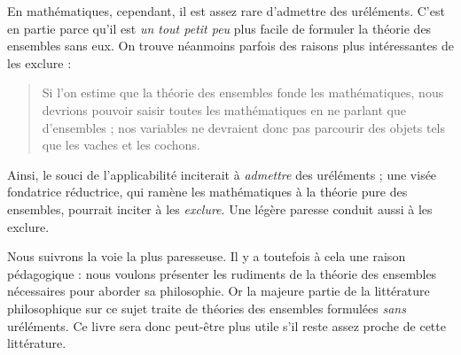 \documentclass[../../../include/open-logic-section]{subfiles}
\begin{document}
En mathématiques, cependant, il est assez rare d'admettre des
uréléments. C'est en partie parce qu'il est \emph{un tout petit peu}
plus facile de formuler la théorie des ensembles sans eux. On trouve
néanmoins parfois des raisons plus intéressantes de les exclure :
\begin{quote}
	Si l'on estime que la théorie des ensembles fonde les
	mathématiques, nous devrions pouvoir saisir toutes les
	mathématiques en ne parlant que d'ensembles ; nos variables ne
	devraient donc pas parcourir des objets tels que les vaches et les
	cochons.
	\citep[p.~8]{Kunen1980}
\end{quote}
Ainsi, le souci de l'applicabilité inciterait à \emph{admettre} des
uréléments ; une visée fondatrice réductrice, qui ramène les
mathématiques à la théorie pure des ensembles, pourrait inciter à
les \emph{exclure}. Une légère paresse conduit aussi à les exclure.

Nous suivrons la voie la plus paresseuse. Il y a toutefois à cela une
raison pédagogique : nous voulons présenter les rudiments de la
théorie des ensembles nécessaires pour aborder sa philosophie. Or
la majeure partie de la littérature philosophique sur ce sujet
traite de théories des ensembles formulées \emph{sans} uréléments.
Ce livre sera donc peut-être plus utile s'il reste assez proche de
cette littérature.
\end{document}
